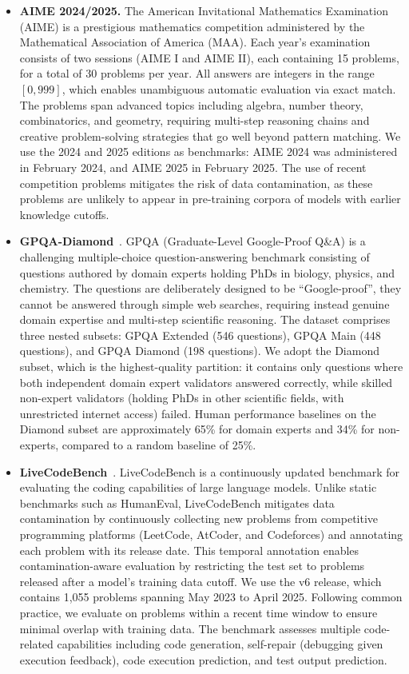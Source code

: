 \begin{itemize}

\item \textbf{AIME 2024/2025.} The American Invitational Mathematics Examination (AIME) is a prestigious mathematics competition administered by the Mathematical Association of America (MAA). Each year's examination consists of two sessions (AIME I and AIME II), each containing 15 problems, for a total of 30 problems per year. All answers are integers in the range $[0, 999]$, which enables unambiguous automatic evaluation via exact match. The problems span advanced topics including algebra, number theory, combinatorics, and geometry, requiring multi-step reasoning chains and creative problem-solving strategies that go well beyond pattern matching. We use the 2024 and 2025 editions as benchmarks: AIME 2024 was administered in February 2024, and AIME 2025 in February 2025. The use of recent competition problems mitigates the risk of data contamination, as these problems are unlikely to appear in pre-training corpora of models with earlier knowledge cutoffs. 

\item \textbf{GPQA-Diamond}~\citep{rein2024gpqa}. GPQA (Graduate-Level Google-Proof Q\&A) is a challenging multiple-choice question-answering benchmark consisting of questions authored by domain experts holding PhDs in biology, physics, and chemistry. The questions are deliberately designed to be ``Google-proof'', they cannot be answered through simple web searches, requiring instead genuine domain expertise and multi-step scientific reasoning. The dataset comprises three nested subsets: GPQA Extended (546 questions), GPQA Main (448 questions), and GPQA Diamond (198 questions). We adopt the Diamond subset, which is the highest-quality partition: it contains only questions where both independent domain expert validators answered correctly, while skilled non-expert validators (holding PhDs in other scientific fields, with unrestricted internet access) failed. Human performance baselines on the Diamond subset are approximately 65\% for domain experts and 34\% for non-experts, compared to a random baseline of 25\%. 

\item \textbf{LiveCodeBench}~\citep{jainlivecodebench}. LiveCodeBench is a continuously updated benchmark for evaluating the coding capabilities of large language models. Unlike static benchmarks such as HumanEval, LiveCodeBench mitigates data contamination by continuously collecting new problems from competitive programming platforms (LeetCode, AtCoder, and Codeforces) and annotating each problem with its release date. This temporal annotation enables contamination-aware evaluation by restricting the test set to problems released after a model's training data cutoff. We use the v6 release, which contains 1,055 problems spanning May 2023 to April 2025. Following common practice, we evaluate on problems within a recent time window to ensure minimal overlap with training data. The benchmark assesses multiple code-related capabilities including code generation, self-repair (debugging given execution feedback), code execution prediction, and test output prediction. 


\end{itemize}
